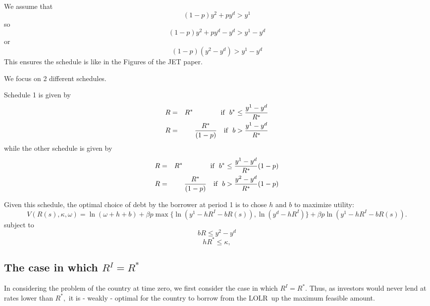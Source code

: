 \documentclass[english,12pt,a4paper]{article}
\begin{document}
We assume that 
\begin{equation*}
(1-p)y^{2}+py^{d}>y^{1}
\end{equation*}%
so%
\begin{equation*}
(1-p)y^{2}+py^{d}-y^{d}>y^{1}-y^{d}
\end{equation*}%
\bigskip or%
\begin{equation*}
\left( 1-p\right) \left( y^{2}-y^{d}\right) >y^{1}-y^{d}
\end{equation*}%
\bigskip This ensures the schedule is like in the Figures of the JET paper.

We focus on 2 different schedules.

Schedule 1 is given by%
\begin{eqnarray*}
R &=&R^{\ast }\text{ \ \ \ \ \ \ \ \ \ \ \ if \ }b^{\ast }\leq \frac{%
y^{1}-y^{d}}{R^{\ast }} \\
R &=&\frac{R^{\ast }}{(1-p)}\ \ \ \text{if \ }b>\frac{y^{1}-y^{d}}{R^{\ast }}
\end{eqnarray*}%
while the other schedule is given by 
\begin{eqnarray*}
R &=&R^{\ast }\text{ \ \ \ \ \ \ \ \ \ \ \ if \ }b^{\ast }\leq \frac{%
y^{1}-y^{d}}{R^{\ast }}(1-p) \\
R &=&\frac{R^{\ast }}{(1-p)}\ \ \ \text{if \ }b>\frac{y^{2}-y^{d}}{R^{\ast }}%
(1-p)
\end{eqnarray*}

Given this schedule, the optimal choice of debt by the borrower at period 1
is to chose $h$ and $b$ to maximize utility: 
\begin{equation}
V(R(s),\kappa ,\omega )=\ln (\omega +h+b)+\beta p\max \{\ln
(y^{1}-hR^{I}-bR(s)),\ln (y^{d}-hR^{I})\}+\beta p\ln (y^{1}-hR^{I}-bR(s)).
\label{OP1}
\end{equation}%
subject to 
\begin{equation}
bR\leq y^{2}-y^{d}  \label{MaxB}
\end{equation}%
\begin{equation}
hR^{\ast }\leq \kappa ,  \label{MaxA}
\end{equation}

\subsection{The case in which $R^{I}=R^{\ast }$}

In considering the problem of the country at time zero, we first consider
the case in which $R^{I}=R^{\ast }.$ Thus, as investors would never lend at
rates lower than $R^{\ast },$ it is - weakly - optimal for the country to
borrow from the LOLR\ up the maximum feasible amount.
\end{document}
